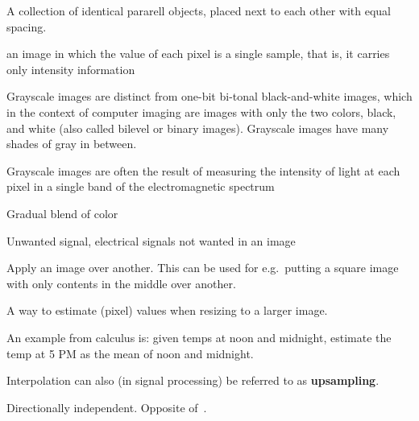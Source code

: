 \begin{definition}[Grating]
    A collection of identical pararell objects, placed next to each other with
    equal spacing.
    \end{definition}
\begin{definition}[Grayscale]
    an image in which the value of each pixel is a single sample, that is, it
    carries only intensity information

    Grayscale images are distinct from one-bit bi-tonal black-and-white images,
    which in the context of computer imaging are images with only the two
    colors, black, and white (also called bilevel or binary images). Grayscale
    images have many shades of gray in between.

    Grayscale images are often the result of measuring the intensity of light
    at each pixel in a single band of the electromagnetic spectrum 

\end{definition}

\begin{definition}
    Gradual blend of color
\end{definition}

\begin{definition}
    Unwanted signal, electrical signals not wanted in an image
\end{definition}

\begin{definition}
    Apply an image over another. This can be used for e.g.\ putting a square image
    with only contents in the middle over another.
\end{definition}

\begin{definition}[Interpolation]
    A way to estimate (pixel) values when resizing to a larger image.

    An example from calculus is: given temps at noon and midnight, estimate
    the temp at 5 PM as the mean of noon and midnight.

    Interpolation can also (in signal processing) be referred to as 
    \textbf{upsampling}.

\end{definition}

\begin{definition}[Isotropy]\label{isotropy}
    Directionally independent. Opposite of~.
\end{definition}

